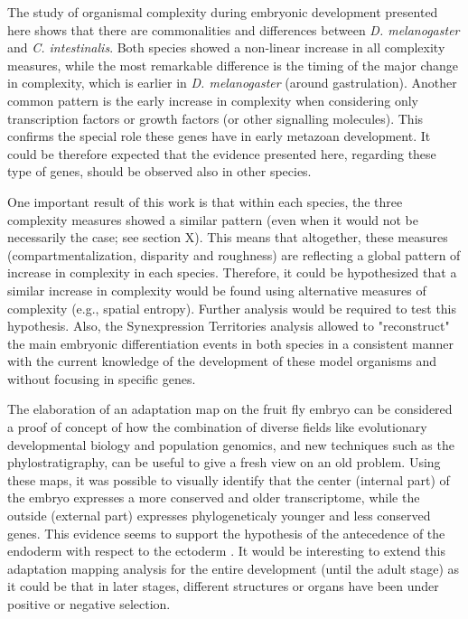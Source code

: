 
The study of organismal complexity during embryonic development presented here shows that there are commonalities and differences between \textit{D. melanogaster} and \textit{C. intestinalis}. Both species showed a non-linear increase in all complexity measures, while the most remarkable difference is the timing of the major change in complexity, which is earlier in \textit{D. melanogaster} (around gastrulation).
Another common pattern is the early increase in complexity when considering only transcription factors or growth factors (or other signalling molecules). This confirms the special role these genes have in early metazoan development. It could be therefore expected that the evidence presented here, regarding these type of genes, should be observed also in other species. 

One important result of this work is that within each species, the three complexity measures showed a similar pattern (even when it would not be necessarily the case; see section X). This means that altogether, these measures (compartmentalization, disparity and roughness) are reflecting a global pattern of increase in complexity in each species. Therefore, it could be hypothesized that a similar increase in complexity would be found using alternative measures of complexity (e.g., spatial entropy). Further analysis would be required to test this hypothesis.
Also, the Synexpression Territories analysis allowed to "reconstruct" the main embryonic differentiation events in both species in a consistent manner with the current knowledge of the development of these model organisms and without focusing in specific genes.

The elaboration of an adaptation map on the fruit fly embryo can be considered a proof of concept of how the combination of diverse fields like evolutionary developmental biology and population genomics, and new techniques such as the phylostratigraphy, can be useful to give a fresh view on an old problem.
Using these maps, it was possible to visually identify that the center (internal part) of the embryo expresses a more conserved and older transcriptome, while the outside (external part) expresses phylogeneticaly younger and less conserved genes. This evidence seems to support the hypothesis of the antecedence of the endoderm with respect to the ectoderm \citep{Hashimshony2014}. It would be interesting to extend this adaptation mapping analysis for the entire development (until the adult stage) as it could be that in later stages, different structures or organs have been under positive or negative selection.

